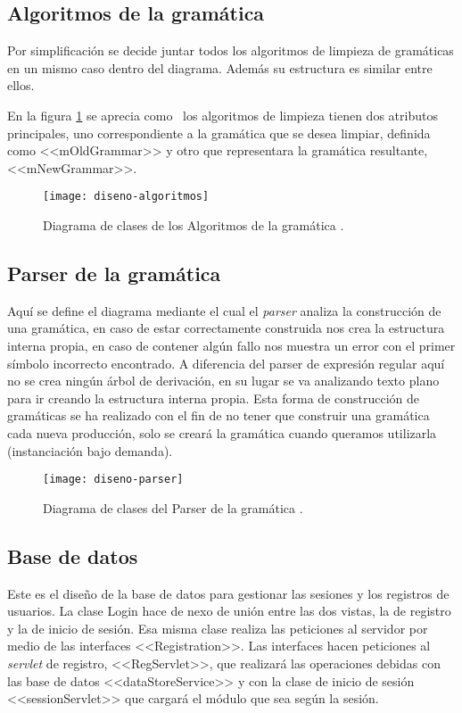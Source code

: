 \subsection{Algoritmos de la gramática}

Por simplificación se decide juntar todos los algoritmos de limpieza de gramáticas en un mismo caso dentro del diagrama. Además su estructura es similar entre ellos.

En la figura \ref{fig:4.3} se aprecia como ~los algoritmos de limpieza tienen dos atributos principales, uno correspondiente a la gramática que se desea limpiar, definida como <<mOldGrammar>> y otro que representara la gramática resultante, <<mNewGrammar>>.

\begin{figure}[h]
\centering
\texttt{[image: diseno-algoritmos]}
\caption{Diagrama de clases de los Algoritmos de la gramática \cite{thothv2}.}
\label{fig:4.3}
\end{figure}

\subsection{Parser de la gramática}

Aquí se define el diagrama mediante el cual el \emph{parser} analiza la construcción de una gramática, en caso de estar correctamente construida nos crea la estructura interna propia, en caso de contener algún fallo nos muestra un error con el primer símbolo incorrecto encontrado.
A diferencia del parser de expresión regular aquí no se crea ningún árbol de
derivación, en su lugar se va analizando texto plano para ir creando la estructura interna propia.
Esta forma de construcción de gramáticas se ha realizado con el fin de no tener que construir una gramática cada nueva producción, solo se creará la gramática cuando queramos utilizarla (instanciación bajo demanda).

\begin{figure}[h]
\centering
\texttt{[image: diseno-parser]}
\caption{Diagrama de clases del Parser de la gramática \cite{thothv2}.}
\label{fig:4.4}
\end{figure}



\subsection{Base de datos}

Este es el diseño de la base de datos para gestionar las sesiones y los registros de usuarios. La clase Login hace de nexo de unión entre las dos vistas, la de registro y la de inicio de sesión. Esa misma clase realiza las peticiones al servidor por medio de las interfaces <<Registration>>. Las interfaces hacen peticiones al \emph{servlet} de registro, <<RegServlet>>, que realizará las operaciones debidas con las base de datos <<dataStoreService>> y con la clase de inicio de sesión <<sessionServlet>> que cargará el módulo que sea según la sesión.

